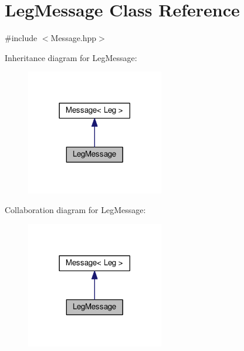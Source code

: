 \hypertarget{classLegMessage}{}\section{Leg\+Message Class Reference}
\label{classLegMessage}


{\ttfamily \#include $<$Message.\+hpp$>$}



Inheritance diagram for Leg\+Message\+:\nopagebreak
\begin{figure}[H]
\begin{center}
\leavevmode
\includegraphics[width=170pt]{classLegMessage__inherit__graph}
\end{center}
\end{figure}


Collaboration diagram for Leg\+Message\+:
\nopagebreak
\begin{figure}[H]
\begin{center}
\leavevmode
\includegraphics[width=170pt]{classLegMessage__coll__graph}
\end{center}
\end{figure}
